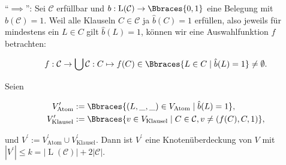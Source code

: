 \begin{solution}
\begin{example*}
\begin{center}
    \end{center}

\end{example*}

\enquote{$\implies$}:
Sei $\mathcal C$ erfüllbar und $b: \operatorname L(\mathcal C) \to \Bbraces{0, 1}$ eine Belegung mit $\hat b(\mathcal C) = 1$.
Weil alle Klauseln $C \in \mathcal C$ ja $\hat b(C) = 1$ erfüllen, also jeweils für mindestens ein $L \in C$ gilt $\hat b(L) = 1$, können wir eine Auswahlfunktion $f$ betrachten:

\begin{align*}
    f:
        \mathcal C \to \bigcup \mathcal C:
        C \mapsto f(C) \in \Bbraces{L \in C \mid \hat b(L) = 1} \neq \emptyset.
\end{align*}

Seien

\begin{align*}
    V_\text{Atom}^\prime
    & :=
    \Bbraces{(L, \_, \_) \in V_\text{Atom} \mid \hat b(L) = 1}, \\
    V_\text{Klausel}^\prime
    & :=
    \Bbraces{v \in V_\text{Klausel} \mid C \in \mathcal C, v \neq (f(C), C, 1)},
\end{align*}

und $V^\prime := V_\text{Atom}^\prime \cup V_\text{Klausel}^\prime$.
Dann ist $V^\prime$ eine Knotenüberdeckung von $V$ mit $|V^\prime| \leq k = |\operatorname L(\mathcal C)| + 2 |\mathcal C|$.

\begin{enumerate}[label = \arabic*.]
    

\end{enumerate}
\end{solution}
